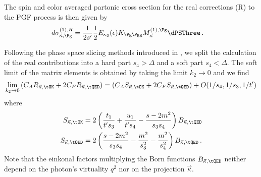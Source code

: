 The spin and color averaged partonic cross section for the real corrections (R) to the PGF process is then given by
\begin{align}
d\sigma_{\vec \kappa,\Pg}^{(1),R} &= \frac 1 {2s'}\frac 1 2 E_{\kappa_2}(\epsilon)K_{\Pg\Pgg} M_{\vec \kappa}^{(1),\Pg} \dPSThree\,.
\end{align}

Following the phase space slicing methods introduced in \cite{Hekhorn:2018ywm}, we split the calculation of the real contributions into a hard part $s_4 > \Delta$ and a soft part $s_4<\Delta$. The soft limit of the matrix elements is obtained by taking the limit $k_2\rightarrow 0$ and we find
\begin{equation}
\lim_{k_2\rightarrow 0}\left(C_A R_{\vec \kappa,\tOK} + 2C_F R_{\vec \kappa,\tQED}\right) = \left(C_A S_{\vec \kappa,\tOK} + 2C_F S_{\vec \kappa,\tQED}\right) + O(1/s_4,1/s_3,1/t')
\end{equation}
where
\begin{align}
S_{\vec \kappa,\tOK}  &= 2\left(\frac{t_1}{t's_3} + \frac{u_1}{t's_4}-\frac{s-2m^2}{s_3s_4}\right)B_{\vec \kappa,\tQED}\\
S_{\vec \kappa,\tQED} &= 2\left(\frac{s-2m^2}{s_3s_4} - \frac{m^2}{s_3^2} - \frac{m^2}{s_4^2}\right)B_{\vec \kappa,\tQED}\,.
\end{align}
Note that the einkonal factors multiplying the Born functions $B_{\vec \kappa,\tQED}$ neither depend on the photon's virtuality $q^2$ nor on the projection $\vec \kappa$.
